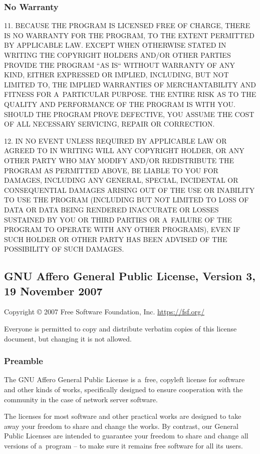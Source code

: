 \documentclass[a4paper, 11pt, twoside]{article}
\begin{document}
\subsubsection{No Warranty}

11. BECAUSE THE PROGRAM IS LICENSED FREE OF CHARGE, THERE IS NO WARRANTY FOR THE PROGRAM, TO THE EXTENT PERMITTED BY APPLICABLE LAW. EXCEPT WHEN OTHERWISE STATED IN WRITING THE COPYRIGHT HOLDERS AND/OR OTHER PARTIES PROVIDE THE PROGRAM “AS IS“ WITHOUT WARRANTY OF ANY KIND, EITHER EXPRESSED OR IMPLIED, INCLUDING, BUT NOT LIMITED TO, THE IMPLIED WARRANTIES OF MERCHANTABILITY AND FITNESS FOR A~PARTICULAR PURPOSE. THE ENTIRE RISK AS TO THE QUALITY AND PERFORMANCE OF THE PROGRAM IS WITH YOU. SHOULD THE PROGRAM PROVE DEFECTIVE, YOU ASSUME THE COST OF ALL NECESSARY SERVICING, REPAIR OR CORRECTION.

12. IN NO EVENT UNLESS REQUIRED BY APPLICABLE LAW OR AGREED TO IN WRITING WILL ANY COPYRIGHT HOLDER, OR ANY OTHER PARTY WHO MAY MODIFY AND/OR REDISTRIBUTE THE PROGRAM AS PERMITTED ABOVE, BE LIABLE TO YOU FOR DAMAGES, INCLUDING ANY GENERAL, SPECIAL, INCIDENTAL OR CONSEQUENTIAL DAMAGES ARISING OUT OF THE USE OR INABILITY TO USE THE PROGRAM (INCLUDING BUT NOT LIMITED TO LOSS OF DATA OR DATA BEING RENDERED INACCURATE OR LOSSES SUSTAINED BY YOU OR THIRD PARTIES OR A~FAILURE OF THE PROGRAM TO OPERATE WITH ANY OTHER PROGRAMS), EVEN IF SUCH HOLDER OR OTHER PARTY HAS BEEN ADVISED OF THE POSSIBILITY OF SUCH DAMAGES.

\subsection{GNU Affero General Public License, Version 3, 19 November 2007}

Copyright © 2007 Free Software Foundation, Inc. \url{https://fsf.org/}

Everyone is permitted to copy and distribute verbatim copies of this license document, but changing it is not allowed.

\subsubsection{Preamble}

The GNU Affero General Public License is a~free, copyleft license for software and other kinds of works, specifically designed to ensure cooperation with the community in the case of network server software.

The licenses for most software and other practical works are designed to take away your freedom to share and change the works. By contrast, our General Public Licenses are intended to guarantee your freedom to share and change all versions of a~program -- to make sure it remains free software for all its users.
\end{document}
